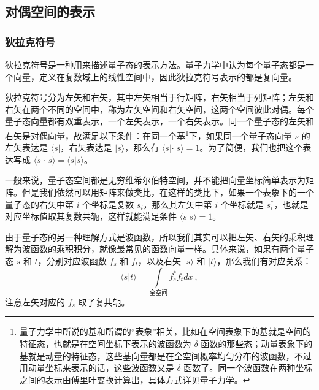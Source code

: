 



\subsection{对偶空间的表示}\label{sub_DualSp_1}


\subsubsection{狄拉克符号}

狄拉克符号是一种用来描述量子态的表示方法。量子力学中认为每个量子态都是一个向量，定义在复数域上的线性空间中，因此狄拉克符号表示的都是复向量。

狄拉克符号分为左矢和右矢，其中左矢相当于行矩阵，右矢相当于列矩阵；左矢和右矢在两个不同的空间中，称为左矢空间和右矢空间，这两个空间彼此对偶。每个量子态向量都有双重表示，一个左矢表示，一个右矢表示。同一个量子态的左矢和右矢是对偶向量，故满足以下条件：在同一个基\footnote{量子力学中所说的基和所谓的“表象”相关，比如在空间表象下的基就是空间的特征态，也就是在空间坐标下表示的波函数为 $\delta$ 函数的那些态；动量表象下的基就是动量的特征态，这些基向量都是在全空间概率均匀分布的波函数，不过用动量坐标来表示的话，这些波函数又是 $\delta$ 函数了。同一个波函数在两种坐标之间的表示由傅里叶变换计算出，具体方式详见量子力学。}下，如果同一个量子态向量 $s$ 的左矢表达是 $\langle s|$，右矢表达是 $|s\rangle$，那么有 $\langle s|\cdot|s\rangle=1$。为了简便，我们也把这个表达写成 $\langle s|\cdot|s\rangle=\langle s|s\rangle$。

一般来说，量子态空间都是无穷维希尔伯特空间，并不能把向量坐标简单表示为矩阵。但是我们依然可以用矩阵来做类比，在这样的类比下，如果一个表象下的一个量子态的右矢中第 $i$ 个坐标是复数 $s_i$，那么其左矢中第 $i$ 个坐标就是 $s_i^*$，也就是对应坐标值取其复数共轭，这样就能满足条件 $\langle s|s\rangle=1$。

由于量子态的另一种理解方式是波函数，所以我们其实可以把左矢、右矢的乘积理解为波函数的乘积积分，就像最常见的函数向量一样。具体来说，如果有两个量子态 $s$ 和 $t$，分别对应波函数 $f_s$ 和 $f_t$，以及右矢 $|s\rangle$ 和 $|t\rangle$，那么我们有对应关系：
\begin{equation}\langle s|t\rangle=\int\limits_{\text{全空间}}f_s^*f_tdx~,\end{equation}
注意左矢对应的 $f_s$ 取了复共轭。









